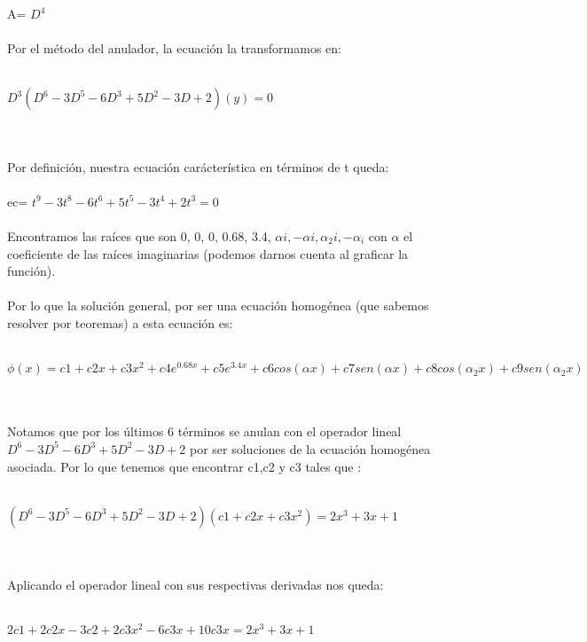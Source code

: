 \documentclass[a4paper,10pt]{article}
\begin{document}
A= $D^{4}$\\\\
Por el método del anulador, la ecuación la transformamos en:\\\\
\centerline{$D^3 (D^{6} - 3D^{5} - 6D^{3} + 5D^{2} - 3D + 2) (y )=0$}\\\\
Por definición, nuestra ecuación carácterística en términos de t queda:\\\\
ec= $t^{9} - 3t^{8} - 6t^{6} + 5t^{5} - 3t^4 + 2t^3 = 0$\\\\
Encontramos las raíces que son 0, 0, 0, 0.68, 3.4, $\alpha i , -\alpha i , \alpha_2 i , -\alpha_ i$ con $\alpha$ el coeficiente de las raíces imaginarias (podemos darnos cuenta al graficar la función).\\\\
Por lo que la solución general, por ser una ecuación homogénea (que sabemos resolver por teoremas) a esta ecuación es:\\\\
\centerline{$\phi(x) = c1 + c2x + c3x^2 + c4e^{0.68 x} + c5 e^{3
.4x} + c6cos(\alpha x) + c7sen(\alpha x) + c8cos(\alpha_2 x) + c9sen(\alpha_2 x)$}\\\\
Notamos que por los últimos 6 términos se anulan con el operador lineal $D^{6} - 3D^{5} - 6D^{3} + 5D^{2} - 3D + 2$ por ser soluciones de la ecuación homogénea asociada. Por lo que tenemos que encontrar c1,c2 y c3 tales que :\\\\
\centerline{$(D^{6} - 3D^{5} - 6D^{3} + 5D^{2} - 3D + 2)(c1 + c2x + c3x^2 )= 2x^3 + 3x + 1$}\\\\
Aplicando el operador lineal con sus respectivas derivadas nos queda:\\\\
\centerline{$2c1 + 2c2x - 3c2 + 2c3x^2 - 6c3x + 10c3x =  2x^3 + 3x + 1$}\\\\
\\\\\
\end{document}
